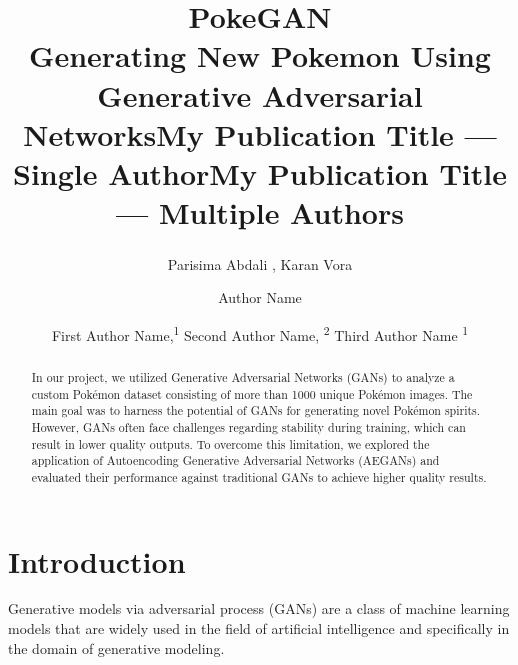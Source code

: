 \documentclass[letterpaper]{article} %
\title{PokeGAN \\ Generating New Pokemon Using Generative Adversarial Networks}
\author{
    Parisima Abdali , \textsuperscript{}
    Karan Vora \textsuperscript{}
}
\title{My Publication Title --- Single Author}
\author {
    Author Name
}
\title{My Publication Title --- Multiple Authors}
\author {
    First Author Name,\textsuperscript{\rm 1}
    Second Author Name, \textsuperscript{\rm 2}
    Third Author Name \textsuperscript{\rm 1}
}
\begin{document}
\maketitle

\begin{abstract}
In our project, we utilized Generative Adversarial Networks (GANs)\cite{GAN} to analyze a custom Pokémon dataset consisting of more than 1000 unique Pokémon images. The main goal was to harness the potential of GANs for generating novel Pokémon spirits. However, GANs often face challenges regarding stability during training, which can result in lower quality outputs. To overcome this limitation, we explored the application of Autoencoding Generative Adversarial Networks (AEGANs)\cite{AEGAN} and evaluated their performance against traditional GANs to achieve higher quality results.
\end{abstract}

\section{Introduction}
Generative models via adversarial process (GANs) \cite{GAN} are a class of machine learning models that are widely used in the field of artificial intelligence and specifically in the domain of generative modeling.
\end{document}
